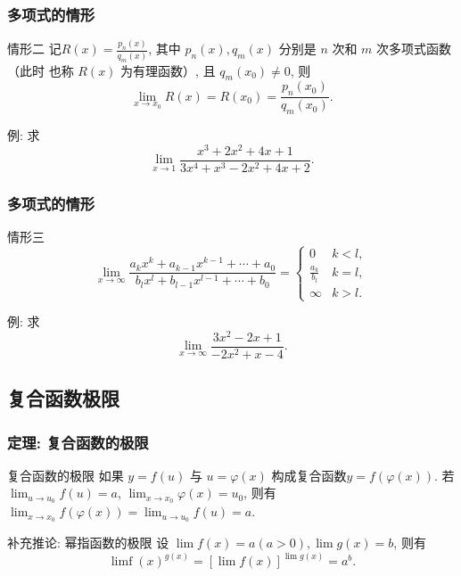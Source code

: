 \documentclass[
10pt,  
aspectratio=43,  
]{beamer}
\begin{document}
\begin{frame}
\frametitle{多项式的情形}

\begin{exampleblock}{情形二}
记$R(x)=\displaystyle\frac{p_n(x)}{q_m(x)}$,   其中 $p_n(x),   q_m(x)$ 分别是 $n$ 次和 $m$ 次多项式函数（此时 也称 $R(x)$ 为有理函数）,  且 $q_m\left(x_0\right) \neq 0$,   则
$$\lim _{x \rightarrow x_0} R(x)=R\left(x_0\right)=\frac{p_n\left(x_0\right)}{q_m\left(x_0\right)}.$$
\end{exampleblock}
例:  求 $$\lim _{x \rightarrow 1} \frac{x^3+2 x^2+4 x+1}{3 x^4+x^3-2 x^2+4 x+2}.$$

\end{frame}

\begin{frame}
\frametitle{多项式的情形}

\begin{exampleblock}{情形三}
$$
\lim _{x \rightarrow \infty} \frac{a_k x^k+a_{k-1} x^{k-1}+\cdots+a_0}{b_l x^{l}+b_{l-1} x^{l-1}+\cdots+b_0}=\left\{\begin{array}{cc}
0 & k<l,   \\
\displaystyle\frac{a_k}{b_l} & k=l,   \\
\infty & k>l.
\end{array}\right.
$$
\end{exampleblock}
例:  求 $$\displaystyle\lim_{x \rightarrow \infty} \frac{3 x^2-2 x+1}{-2 x^2+x-4}.$$
\end{frame}

\subsection{复合函数极限}

\begin{frame}
\frametitle{定理: 复合函数的极限}

\begin{block}{复合函数的极限}
如果 $y=f(u)$ 与 $u=\varphi(x)$ 构成复合函数$y=f(\varphi(x))$. 若 $\lim _{u \rightarrow u_0} f(u)=a$,   $\lim _{x \rightarrow x_0} \varphi(x)=u_0$,   则有 $\lim _{x \rightarrow x_0} f(\varphi(x))=\lim _{u \rightarrow u_0} f(u)=a$.
\end{block}
\pause
\begin{exampleblock}{补充推论: 幂指函数的极限}
设 $\lim f(x)=a(a>0),   \lim g(x)=b$,   则有
$$
\operatorname{limf}(x)^{g(x)}=[\lim f(x)]^{\lim g(x)}=a^b.
$$
\end{exampleblock}
\end{frame}
\end{document}
